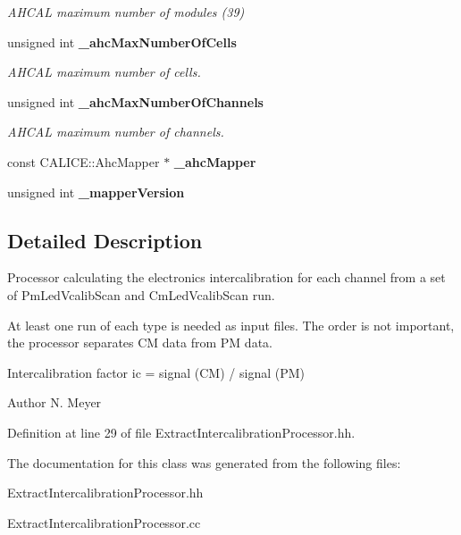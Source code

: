\begin{DoxyCompactItemize}
\begin{DoxyCompactList}\small\item\em A\-H\-C\-A\-L maximum number of modules (39) \end{DoxyCompactList}\item 
unsigned int {\bf \-\_\-ahc\-Max\-Number\-Of\-Cells}\label{classExtractIntercalibrationProcessor_a659e0f833a54e8389820d0fa6424b716}

\begin{DoxyCompactList}\small\item\em A\-H\-C\-A\-L maximum number of cells. \end{DoxyCompactList}\item 
unsigned int {\bf \-\_\-ahc\-Max\-Number\-Of\-Channels}\label{classExtractIntercalibrationProcessor_a693b0d0ebafc572ecffe39ce19b75c87}

\begin{DoxyCompactList}\small\item\em A\-H\-C\-A\-L maximum number of channels. \end{DoxyCompactList}\item 
const C\-A\-L\-I\-C\-E\-::\-Ahc\-Mapper $\ast$ {\bfseries \-\_\-ahc\-Mapper}\label{classExtractIntercalibrationProcessor_ae81b815805190b458c244c540cc4f7c8}

\item 
unsigned int {\bfseries \-\_\-mapper\-Version}\label{classExtractIntercalibrationProcessor_ac28474a6ef717635d3c79a4cb440821c}

\end{DoxyCompactItemize}


\subsection{Detailed Description}
Processor calculating the electronics intercalibration for each channel from a set of Pm\-Led\-Vcalib\-Scan and Cm\-Led\-Vcalib\-Scan run. 

At least one run of each type is needed as input files. The order is not important, the processor separates C\-M data from P\-M data.

Intercalibration factor ic = signal (C\-M) / signal (P\-M)

\begin{DoxyAuthor}{Author}
N. Meyer 
\end{DoxyAuthor}


Definition at line 29 of file Extract\-Intercalibration\-Processor.\-hh.



The documentation for this class was generated from the following files\-:\begin{DoxyCompactItemize}
\item 
Extract\-Intercalibration\-Processor.\-hh\item 
Extract\-Intercalibration\-Processor.\-cc\end{DoxyCompactItemize}
